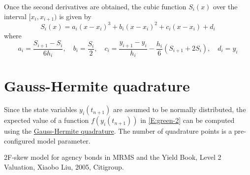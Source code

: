 \documentclass{texyise}
\begin{document}
Once the second derivatives are obtained, the cubic function $S_i(x)$ over the interval $[x_{i}, x_{i+1})$ is given by
\begin{equation}
    S_i(x) = a_i(x - x_i)^3 + b_i(x - x_i)^2 + c_i(x - x_i) + d_i
\end{equation}
where
\begin{equation}
    a_i = \frac{S_{i+1} - S_i}{6h_i}, \quad b_i = \frac{S_i}{2}, \quad c_i = \frac{y_{i+1} - y_i}{h_i} - \frac{h_i}{6}(S_{i+1} + 2S_i), \quad d_i = y_i
\end{equation}

\section{Gauss-Hermite quadrature}

Since the state variables $y_i(t_{n+1})$ are assumed to be normally distributed, the expected value of a function $f(y_i(t_{n+1}))$ in \eqref{E:green-2} can be computed using the \href{https://en.wikipedia.org/wiki/Gauss%E2%80%93Hermite_quadrature}{Gauss-Hermite quadrature}. The number of quadrature points is a pre-configured model parameter. 

\begin{thebibliography}{}
    
     2F-skew model for agency bonds in MRMS and the Yield Book, Level 2 Valuation, Xiaobo Liu, 2005, Citigroup.


\end{thebibliography}
\end{document}
